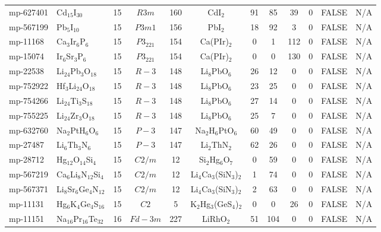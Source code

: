 {\begin{longtable}{llcccccccccc}
    mp-627401 & Cd$_{15}$I$_{30}$ & 15    & $R3m$ & 160   & CdI$_{2}$ & 91    & 85    & 39    & 0     & FALSE & N/A \\
    mp-567199 & Pb$_{5}$I$_{10}$ & 15    & $P3m1$ & 156   & PbI$_{2}$ & 18    & 92    & 3     & 0     & FALSE & N/A \\
    mp-11168 & Ca$_{3}$Ir$_{6}$P$_{6}$ & 15    & $P3_221$ & 154   & Ca(PIr)$_{2}$ & 0     & 1     & 112   & 0     & FALSE & N/A \\
    mp-15074 & Ir$_{6}$Sr$_{3}$P$_{6}$ & 15    & $P3_221$ & 154   & Ca(PIr)$_{2}$ & 0     & 0     & 130   & 0     & FALSE & N/A \\
    mp-22538 & Li$_{24}$Pb$_{3}$O$_{18}$ & 15    & $R-3$ & 148   & Li$_{8}$PbO$_{6}$ & 26    & 12    & 0     & 0     & FALSE & N/A \\
    mp-752922 & Hf$_{3}$Li$_{24}$O$_{18}$ & 15    & $R-3$ & 148   & Li$_{8}$PbO$_{6}$ & 23    & 25    & 0     & 0     & FALSE & N/A \\
    mp-754266 & Li$_{24}$Ti$_{3}$S$_{18}$ & 15    & $R-3$ & 148   & Li$_{8}$PbO$_{6}$ & 27    & 14    & 0     & 0     & FALSE & N/A \\
    mp-755225 & Li$_{24}$Zr$_{3}$O$_{18}$ & 15    & $R-3$ & 148   & Li$_{8}$PbO$_{6}$ & 25    & 7     & 0     & 0     & FALSE & N/A \\
    mp-632760 & Na$_{2}$PtH$_{6}$O$_{6}$ & 15    & $P-3$ & 147   & Na$_{2}$H$_{6}$PtO$_{6}$ & 60    & 49    & 0     & 0     & FALSE & N/A \\
    mp-27487 & Li$_{6}$Th$_{3}$N$_{6}$ & 15    & $P-3$ & 147   & Li$_{2}$ThN$_{2}$ & 62    & 26    & 0     & 0     & FALSE & N/A \\
    mp-28712 & Hg$_{12}$O$_{14}$Si$_{4}$ & 15    & $C2/m$ & 12    & Si$_{2}$Hg$_{6}$O$_{7}$ & 0     & 59    & 0     & 0     & FALSE & N/A \\
    mp-567219 & Ca$_{6}$Li$_{8}$N$_{12}$Si$_{4}$ & 15    & $C2/m$ & 12    & Li$_{4}$Ca$_{3}$(SiN$_{3}$)$_{2}$ & 1     & 74    & 0     & 0     & FALSE & N/A \\
    mp-567371 & Li$_{8}$Sr$_{6}$Ge$_{4}$N$_{12}$ & 15    & $C2/m$ & 12    & Li$_{4}$Ca$_{3}$(SiN$_{3}$)$_{2}$ & 2     & 63    & 0     & 0     & FALSE & N/A \\
    mp-11131 & Hg$_{6}$K$_{4}$Ge$_{4}$S$_{16}$ & 15    & $C2$  & 5     & K$_{2}$Hg$_{3}$(GeS$_{4}$)$_{2}$ & 0     & 0     & 26    & 0     & FALSE & N/A \\
    mp-11151 & Na$_{16}$Pr$_{16}$Te$_{32}$ & 16    & $Fd-3m$ & 227   & LiRhO$_{2}$ & 51    & 104   & 0     & 0     & FALSE & N/A \\

\end{longtable}}
